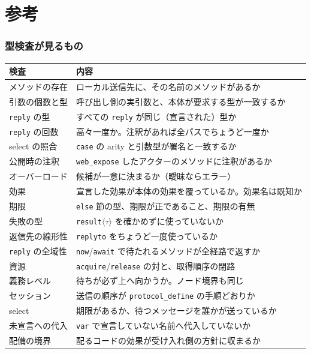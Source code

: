 \documentclass[11pt,a4paper]{ltjsarticle}
\begin{document}
\part{参考}

\section{型検査が見るもの}

\begin{center}
\small
\begin{tabular}{@{}lp{9.0cm}@{}}
\toprule
検査 & 内容 \\
\midrule
メソッドの存在      & ローカル送信先に、その名前のメソッドがあるか \\
引数の個数と型      & 呼び出し側の実引数と、本体が要求する型が一致するか \\
\texttt{reply} の型 & すべての \texttt{reply} が同じ（宣言された）型か \\
\texttt{reply} の回数 & 高々一度か。注釈があれば全パスでちょうど一度か \\
select の照合       & \texttt{case} の arity と引数型が署名と一致するか \\
公開時の注釈        & \texttt{web\_expose} したアクターのメソッドに注釈があるか \\
オーバーロード      & 候補が一意に決まるか（曖昧ならエラー） \\
効果                & 宣言した効果が本体の効果を覆っているか。効果名は既知か \\
期限                & \texttt{else} 節の型、期限が正であること、期限の有無 \\
失敗の型            & \texttt{result}$\langle\tau\rangle$ を確かめずに使っていないか \\
返信先の線形性      & \texttt{replyto} をちょうど一度使っているか \\
\texttt{reply} の全域性 & \texttt{now}/\texttt{await} で待たれるメソッドが全経路で返すか \\
資源                & \texttt{acquire}/\texttt{release} の対と、取得順序の閉路 \\
義務レベル          & 待ちが必ず上へ向かうか。ノード境界も同じ \\
セッション          & 送信の順序が \texttt{protocol\_define} の手順どおりか \\
select              & 期限があるか、待つメッセージを誰かが送っているか \\
未宣言への代入      & \texttt{var} で宣言していない名前へ代入していないか \\
配備の境界          & 配るコードの効果が受け入れ側の方針に収まるか \\
\bottomrule
\end{tabular}
\end{center}
\end{document}
